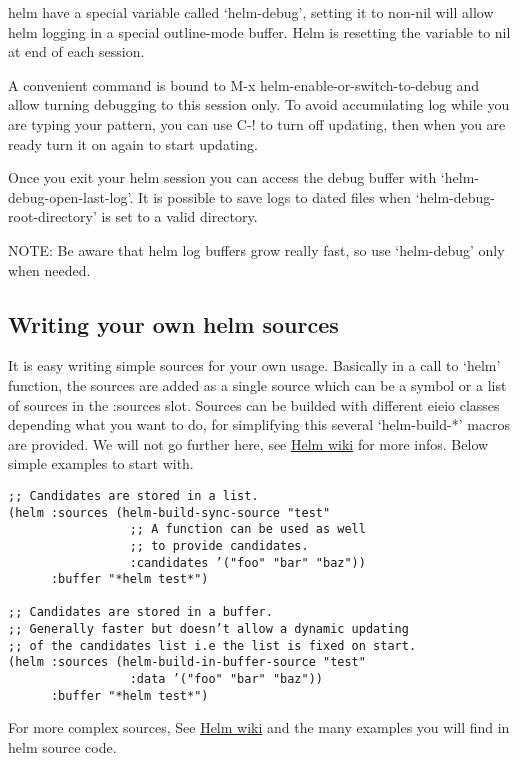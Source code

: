 \documentclass[11pt]{article}
\begin{document}
helm have a special variable called ‘helm-debug’, setting it to non-nil
will allow helm logging in a special outline-mode buffer.
Helm is resetting the variable to nil at end of each session.

A convenient command is bound to M-x helm-enable-or-switch-to-debug
and allow turning debugging to this session only.
To avoid accumulating log while you are typing your pattern, you can use
C-! to turn off updating, then when you
are ready turn it on again to start updating.

Once you exit your helm session you can access the debug buffer with ‘helm-debug-open-last-log’.
It is possible to save logs to dated files when ‘helm-debug-root-directory’
is set to a valid directory.

NOTE: Be aware that helm log buffers grow really fast, so use ‘helm-debug’ only when needed.

\subsection{Writing your own helm sources}
\label{sec:orga6f61b2}

It is easy writing simple sources for your own usage.
Basically in a call to ‘helm’ function, the sources are added as a
single source which can be a symbol or a list of sources in the :sources slot.
Sources can be builded with different eieio classes depending
what you want to do, for simplifying this several ‘helm-build-*’ macros are provided.
We will not go further here, see \href{https://github.com/emacs-helm/helm/wiki/Developing}{Helm wiki} for more infos.
Below simple examples to start with.

\begin{verbatim}
;; Candidates are stored in a list.
(helm :sources (helm-build-sync-source "test"
                 ;; A function can be used as well
                 ;; to provide candidates.
                 :candidates ’("foo" "bar" "baz"))
      :buffer "*helm test*")

;; Candidates are stored in a buffer.
;; Generally faster but doesn’t allow a dynamic updating
;; of the candidates list i.e the list is fixed on start.
(helm :sources (helm-build-in-buffer-source "test"
                 :data ’("foo" "bar" "baz"))
      :buffer "*helm test*")
\end{verbatim}

For more complex sources, See \href{https://github.com/emacs-helm/helm/wiki/Developing}{Helm wiki}
and the many examples you will find in helm source code.
\end{document}
